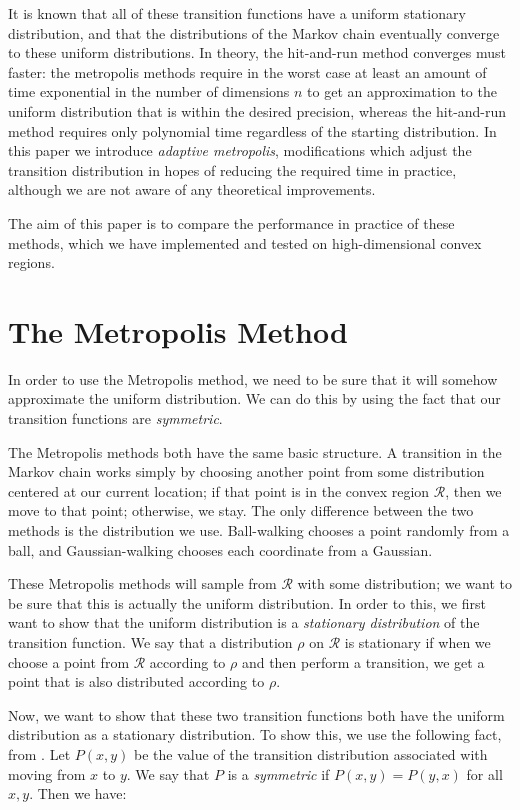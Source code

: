 \documentclass[11pt]{article}
\begin{document}
It is known that all of these transition functions have a uniform stationary distribution, and that the distributions of the Markov chain eventually converge to these uniform distributions. In theory, the hit-and-run method converges must faster: the metropolis methods require in the worst case at least an amount of time exponential in the number of dimensions $n$ to get an approximation to the uniform distribution that is within the desired precision, whereas the hit-and-run method requires only polynomial time regardless of the starting distribution. In this paper we introduce \emph{adaptive metropolis}, modifications which adjust the transition distribution in hopes of reducing the required time in practice, although we are not aware of any theoretical improvements.

The aim of this paper is to compare the performance in practice of these methods, which we have implemented and tested on high-dimensional convex regions.

\section{The Metropolis Method}

In order to use the Metropolis method, we need to be sure that it will somehow approximate the uniform distribution. We can do this by using the fact that our transition functions are \emph{symmetric}.

The Metropolis methods both have the same basic structure. A transition in the Markov chain works simply by choosing another point from some distribution centered at our current location; if that point is in the convex region $\mathcal{R}$, then we move to that point; otherwise, we stay. The only difference between the two methods is the distribution we use. Ball-walking chooses a point randomly from a ball, and Gaussian-walking chooses each coordinate from a Gaussian.

These Metropolis methods will sample from $\mathcal{R}$ with some distribution; we want to be sure that this is actually the uniform distribution. In order to this, we first want to show that the uniform distribution is a \emph{stationary distribution} of the transition function. We say that a distribution $\rho$ on $\mathcal{R}$ is stationary if when we choose a point from $\mathcal{R}$ according to $\rho$ and then perform a transition, we get a point that is also distributed according to $\rho$.

Now, we want to show that these two transition functions both have the uniform distribution as a stationary distribution. To show this, we use the following fact, from \cite{Smith}. Let $P(x,y)$ be the value of the transition distribution associated with moving from $x$ to $y$. We say that $P$ is a \emph{symmetric} if $P(x,y) = P(y,x)$ for all $x,y$. Then we have:
\end{document}
